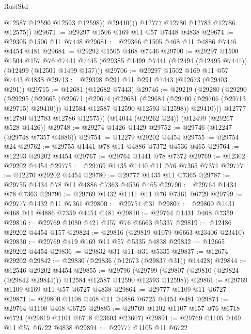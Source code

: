 \begin{lexlean}{RustStd}
\begin{coremodule}
                  @12587
                  @12590
                  @12593
                  @12598))
              @29410)))
        @12777
        @12780
        @12783
        @12786
        @12575))
@29671 := @29297 @1506 @169 @11 @57 @7448 @4838
@29674 := @29305 @1506 @11 @7448
@29681 := @29366 @1505 @468 @11 @4886 @7446 @4454 @481
@29684 := @29292 @1505 @468 @7446
@29700 := @29297
    @1500
    @1504
    @157
    @76
    @7441
    @7445
    (@29385 @1499 @7441 (@12494 (@12495 @7441)) (@12499 (@12501 @1499 @157)))
@29706 := @29297 @1502 @169 @11 @57 @7443 @4838
@29713 := @29398 @291 @11 @291 @7443 (@12673 (@29403 @291))
@29715 := @12681 (@12682 @7443)
@29746 := @29219
    (@29280
      (@29290
        (@29295
          (@29665
            (@29671
              (@29674
                (@29681
                  (@29684 (@29700 (@29706 (@29713 @29715) @29410)))
                  @12584
                  @12587
                  @12590
                  @12593
                  @12598))
              @29410)))
        @12777
        @12780
        @12783
        @12786
        @12575))
    (@14044 (@29262 @24))
    (@12499 (@29267 @528 @1426))
@29748 := @29274 @1426 @1429
@29752 := @29746 (@12247 (@29748 @7357 @4886))
@29754 := @12279 @29202 @4454
@29755 := @29754 @24
@29762 := @29755 @1441 @78 @11 @4886 @7372 @4536 @465
@29764 := @12293 @29202 @4454
@29767 := @29764 @1441 @78 @7372
@29769 := @12302 @29202 @4454
@29775 := @29769 @1435 @1440 @11 @76 @7365 @7371
@29777 := @12270 @29202 @4454
@29780 := @29777 @1435 @11 @7365
@29787 := @29755 @1434 @78 @11 @4886 @7363 @4536 @465
@29790 := @29764 @1434 @78 @7363
@29796 := @29769 @1432 @1111 @11 @76 @7361 @6729
@29799 := @29777 @1432 @11 @7361
@29800 := @29754 @31
@29807 := @29800 @1431 @468 @11 @4886 @7359 @4454 @481
@29810 := @29764 @1431 @468 @7359
@29816 := @29769 @1080 @421 @157 @76 @6663 @5337
@29819 := @12486 @29202 @4454 @157
@29824 := @29816 (@29819 @1079 @6663 @23406 @23410)
@29830 := @29769 @419 @169 @11 @57 @5335 @4838
@29832 := @12665 @29202 @4454
@29836 := @29832 @31 @11 @31 @5335
@29837 := @12674 @29202
@29842 := @29830 (@29836 (@12673 (@29837 @31)) @14428)
@29844 := @12546 @29202 @4454
@29855 := @29796
    (@29799 (@29807 (@29810 (@29824 (@29842 @29844))) @12584 @12587 @12590 @12593 @12598))
@29861 := @29769 @1109 @169 @11 @57 @6727 @4838
@29864 := @29777 @1109 @11 @6727
@29871 := @29800 @1108 @468 @11 @4886 @6725 @4454 @481
@29874 := @29764 @1108 @468 @6725
@29885 := @29769 @1102 @1107 @157 @76 @6718 @6724 (@29819 @1101 @6718 @23603 @23607)
@29891 := @29769 @1105 @169 @11 @57 @6722 @4838
@29894 := @29777 @1105 @11 @6722

\end{coremodule}
\end{lexlean}
